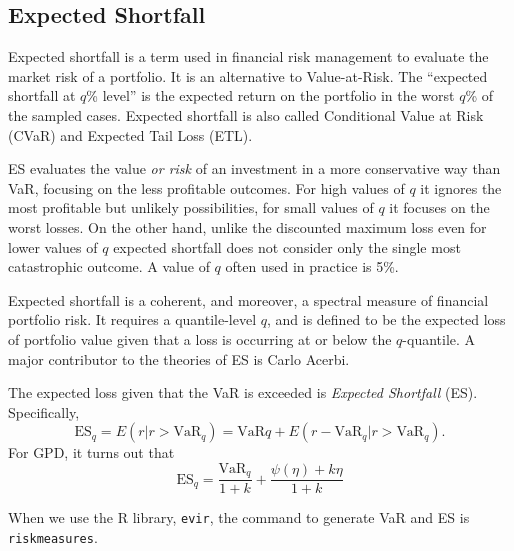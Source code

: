 \subsection{Expected Shortfall}
Expected shortfall is a term used in financial risk management to evaluate the market risk of a portfolio. It is an alternative to Value-at-Risk. The ``expected shortfall at $q$\% level'' is the expected return on the portfolio in the worst $q$\% of the sampled cases. Expected shortfall is also called Conditional Value at Risk (CVaR) and Expected Tail Loss (ETL).

ES evaluates the value \emph{or risk} of an investment in a more conservative way than VaR, focusing on the less profitable outcomes. For high values of $q$ it ignores the most profitable but unlikely possibilities, for small values of $q$ it focuses on the worst losses. On the other hand, unlike the discounted maximum loss even for lower values of $q$ expected shortfall does not consider only the single most catastrophic outcome. A value of $q$ often used in practice is 5\%.

Expected shortfall is a coherent, and moreover, a spectral measure of financial portfolio risk. It requires a quantile-level $q$, and is defined to be the expected loss of portfolio value given that a loss is occurring at or below the $q$-quantile. A major contributor to the theories of ES is Carlo Acerbi.

The expected loss given that the VaR is exceeded is \emph{Expected Shortfall} (ES). Specifically,
\[
\text{ES}_q = E(r|r>\text{VaR}_q) = \text{VaR}q + E(r-\text{VaR}_q|r>\text{VaR}_q).
\]
For GPD, it turns out that
\[
\text{ES}_q = \frac{\text{VaR}_q}{1+k} + \frac{\psi(\eta)+k\eta}{1+k}
\]

When we use the R library, \texttt{evir}, the command to generate VaR and ES is \texttt{riskmeasures}.
